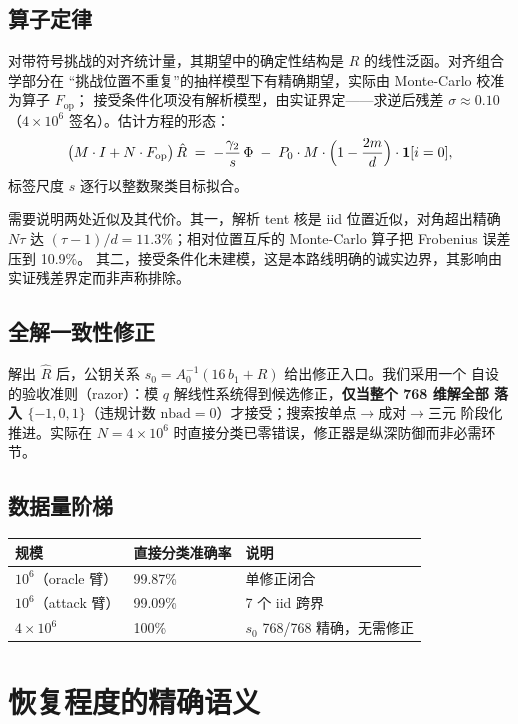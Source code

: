 \documentclass[UTF8,11pt,a4paper]{ctexart}
\begin{document}
\subsection{算子定律}

对带符号挑战的对齐统计量，其期望中的确定性结构是 $R$ 的线性泛函。对齐组合学部分在
``挑战位置不重复''的抽样模型下有精确期望，实际由 Monte-Carlo 校准为算子 $F_{\mathrm{op}}$；
接受条件化项没有解析模型，由实证界定——求逆后残差 $\sigma \approx 0.10$
（$4\times10^6$ 签名）。估计方程的形态：
\[
\bigl(M\cdot I + N\cdot F_{\mathrm{op}}\bigr)\,\hat R
\;=\; -\frac{\gamma_2}{s}\,\Phi \;-\; P_0\cdot M\cdot\Bigl(1-\frac{2m}{d}\Bigr)\cdot\mathbf{1}[i=0],
\]
标签尺度 $s$ 逐行以整数聚类目标拟合。

需要说明两处近似及其代价。其一，解析 tent 核是 iid 位置近似，对角超出精确 $N\tau$ 达
$(\tau-1)/d = 11.3\%$；相对位置互斥的 Monte-Carlo 算子把 Frobenius 误差压到 10.9\%。
其二，接受条件化未建模，这是本路线明确的诚实边界，其影响由实证残差界定而非声称排除。

\subsection{全解一致性修正}

解出 $\hat R$ 后，公钥关系 $s_0 = A_0^{-1}(16\,b_1 + R)$ 给出修正入口。我们采用一个
自设的验收准则（razor）：模 $q$ 解线性系统得到候选修正，\textbf{仅当整个 768 维解全部
落入 $\{-1,0,1\}$}（违规计数 $\mathrm{nbad}=0$）才接受；搜索按单点$\to$成对$\to$三元
阶段化推进。实际在 $N=4\times10^6$ 时直接分类已零错误，修正器是纵深防御而非必需环节。

\subsection{数据量阶梯}

\begin{table}[htbp]\centering\small
\begin{tabular}{@{}lll@{}}
\toprule
规模 & 直接分类准确率 & 说明 \\
\midrule
$10^6$（oracle 臂） & 99.87\% & 单修正闭合 \\
$10^6$（attack 臂） & 99.09\% & 7 个 iid 跨界 \\
$4\times10^6$ & 100\% & $s_0$ 768/768 精确，无需修正 \\
\bottomrule
\end{tabular}
\end{table}

\section{恢复程度的精确语义}
\end{document}
